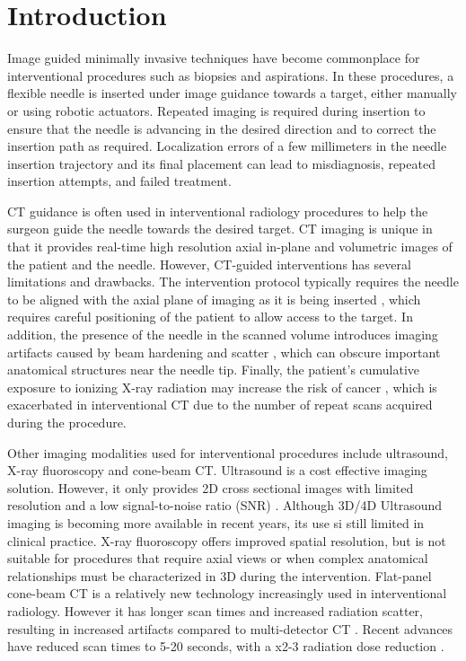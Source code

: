 \section*{Introduction}

Image guided minimally invasive techniques have become commonplace for interventional procedures such as biopsies and aspirations.
In these procedures, a flexible needle is inserted under image guidance towards a target, either manually or using robotic actuators. Repeated imaging is required during insertion to ensure that the needle is advancing in the desired direction and to correct the insertion path as required. Localization errors of a few millimeters in the needle insertion trajectory and its final placement can lead to misdiagnosis, repeated insertion attempts, and failed treatment.

CT guidance is often used in interventional radiology procedures to help the surgeon guide the needle towards the desired target. CT imaging is unique in that it provides real-time high resolution axial in-plane and volumetric images of the patient and the needle. However,
CT-guided interventions has several limitations and drawbacks.
The intervention protocol typically requires the needle to be aligned with the axial plane of imaging as it is being inserted \cite{gupta2014ct}, which requires careful positioning of the patient to allow access to the target. In addition, the presence of the needle in the scanned volume introduces imaging artifacts caused by beam hardening and scatter \cite{boas2012ctartifacts}, which can obscure important anatomical structures near the needle tip. Finally, the patient's cumulative exposure to ionizing X-ray radiation may increase the risk of cancer \cite{mettler2000ct, chodick2007excess}, which is exacerbated in interventional CT due to the number of repeat scans acquired during the procedure.

Other imaging modalities used for interventional procedures include ultrasound, X-ray fluoroscopy and cone-beam CT.
Ultrasound is a cost effective imaging solution. However, it only provides 2D cross sectional images with limited resolution and a low signal-to-noise ratio (SNR) \cite{sheafor2000comparison}. Although 3D/4D Ultrasound imaging is becoming more available in recent years, 
its use si still limited in clinical practice.
X-ray fluoroscopy offers improved spatial resolution, but is not suitable for procedures that require axial views or when complex anatomical relationships must be characterized in 3D during the intervention.
Flat-panel cone-beam CT is a relatively new technology increasingly used in interventional radiology. However it has longer scan times and increased radiation scatter, resulting in increased artifacts compared to multi-detector CT \cite{orth2008cbct}. Recent advances have reduced scan times to 5-20 seconds, with a x2-3 radiation dose reduction \cite{dynact}.


